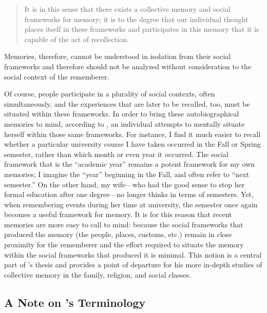 \begin{quote}
    It is in this sense that there exists a collective memory and social frameworks for memory; it is to the degree that our individual thought places itself in these frameworks and participates in this memory that it is capable of the act of recollection.%
        \autocite[38]{halbwachs1992}
\end{quote}  
\noindent
Memories, therefore, cannot be understood in isolation from their social frameworks and therefore should not be analyzed without consideration to the social context of the rememberer.  

Of course, people participate in a plurality of social contexts, often simultaneously, and the experiences that are later to be recalled, too, must be situated within these frameworks. In order to bring these autobiographical memories to mind, according to \halbwachs, an individual attempts to mentally situate herself within those same frameworks.%
    \autocite[38]{halbwachs1992}
For instance, I find it much easier to recall whether a particular university course I have taken occurred in the Fall or Spring semester, rather than which month or even year it occurred. The social framework that is the ``academic year'' remains a potent framework for my own memories; I imagine the ``year'' beginning in the Fall, and often refer to ``next semester.'' On the other hand, my wife---who had the good sense to stop her formal education after one degree---no longer thinks in terms of semesters. Yet, when remembering events during her time at university, the semester once again becomes a useful framework for memory. It is for this reason that recent memories are more easy to call to mind: because the social frameworks that produced the memory (the people, places, customs, etc.) remain in close proximity for the rememberer and the effort required to situate the memory within the social frameworks that produced it is minimal.%
    \autocite[52]{halbwachs1992}
This notion is a central part of \halbwachs's thesis and provides a point of departure for his more in-depth studies of collective memory in the family, religion, and social classes.  

\subsection{A Note on \halbwachs's Terminology}


